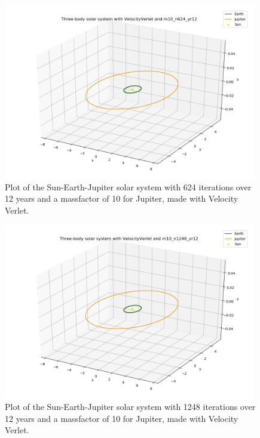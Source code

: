 \documentclass{article}
\begin{document}
    \begin{figure}[H]
        \centering
        \includegraphics[width = 11cm]{img/plot3D_S_E_J_V_m10_n624_yr12.png}
        \caption{Plot of the Sun-Earth-Jupiter solar system with 624 iterations over 12 years and a massfactor of 10 for Jupiter, made with Velocity Verlet.}
        \label{fig:plot3D_S_E_J_V_m10_n624_yr12}
    \end{figure}

    \begin{figure}[H]
        \centering
        \includegraphics[width = 11cm]{img/plot3D_S_E_J_V_m10_n1248_yr12.png}
        \caption{Plot of the Sun-Earth-Jupiter solar system with 1248 iterations over 12 years and a massfactor of 10 for Jupiter, made with Velocity Verlet.}
        \label{fig:plot3D_S_E_J_V_m10_n1248_yr12}
    \end{figure}
\end{document}
